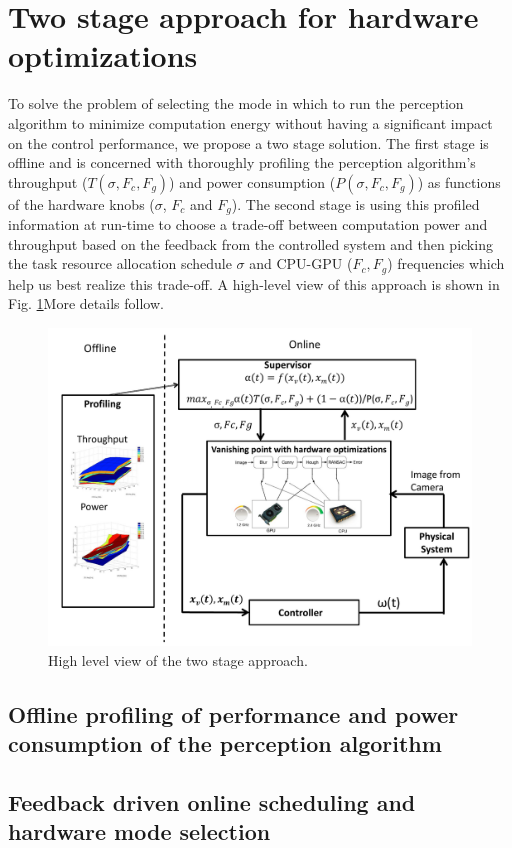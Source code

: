 \section{Two stage approach for hardware optimizations}
\label{sec:twoStage}
To solve the problem of selecting the mode in which to run the perception algorithm to minimize computation energy without having a significant impact on the control performance, we propose a two stage solution. The first stage is offline and is concerned with thoroughly profiling the perception algorithm's throughput ($T(\sigma,F_c,F_g)$) and power consumption ($P(\sigma,F_c,F_g)$) as functions of the hardware knobs ($\sigma$, $F_c$ and $F_g$). The second stage is using this profiled information at run-time to choose a trade-off between computation power and throughput based on the feedback from the controlled system and then picking the task resource allocation schedule $\sigma$ and CPU-GPU ($F_c,F_g$) frequencies which help us best realize this trade-off. A high-level view of this approach is shown in Fig. \ref{fig:juicyj}More details follow.

\begin{figure}[htbp]
	\centering
	\includegraphics[scale=0.36]{Figs/bigFig.pdf}
	\caption{High level view of the two stage approach.}
	\label{fig:juicyj}%
\end{figure}

\subsection{Offline profiling of performance and power consumption of the perception algorithm}
\label{sec:profiling}


\subsection{Feedback driven online scheduling and hardware mode selection}
\label{sec:scheduling}

